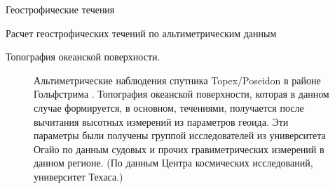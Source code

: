 \begin{chapter}{Геострофические течения}
\begin{section}{Расчет геострофических течений по альтиметрическим данным}
\begin{paragraph}{Топография океанской поверхности.}
\begin{figure}[t!]
\caption{Альтиметрические наблюдения спутника Topex/Poseidon%
 в районе
Гольфстрима%
. 
Топография океанской поверхности, которая в данном случае
формируется, в основном, течениями, получается после вычитания
высотных измерений из параметров геоида. 
Эти параметры были получены группой исследователей из университета Огайо 
по данным судовых и прочих гравиметрических измерений в данном регионе.
(По данным Центра космических исследований, университет Техаса.)}
\label{sshprofile}
\end{figure}
%
\end{paragraph}


\end{section}
\end{chapter}
